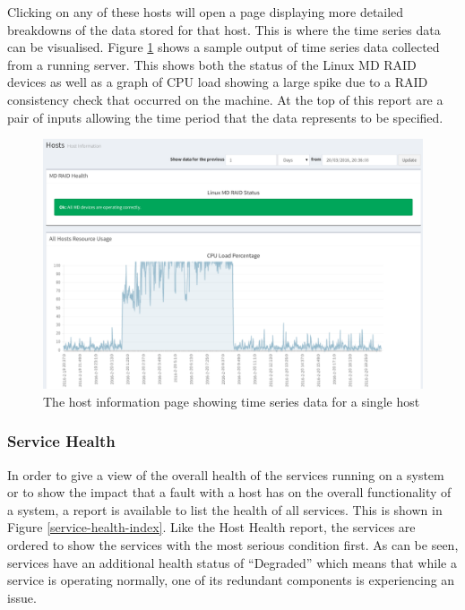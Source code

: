 \documentclass[bsc,logo,twoside,parskip,singlespacing,notimes]{infthesis}
\begin{document}
	Clicking on any of these hosts will open a page displaying more detailed
	breakdowns of the data stored for that host.  This is where the time series
	data can be visualised.  Figure \ref{host-information} shows a sample
	output of time series data collected from a running server.  This shows both
	the status of the Linux MD RAID devices as well as a graph of CPU load
	showing a large spike due to a RAID consistency check that occurred on the
	machine.  At the top of this report are a pair of inputs allowing the time
	period that the data represents to be specified.

\begin{figure}[H]
	\centering
	\caption{The host information page showing time series data for a single host}
	\label{host-information}
	\includegraphics[scale=0.43]{assets/screenshots/host-information.pdf}
\end{figure}

\subsubsection{Service Health}

	In order to give a view of the overall health of the services running on a
	system or to show the impact that a fault with a host has on the overall
	functionality of a system, a report is available to list the health of all
	services.  This is shown in Figure \ref{service-health-index}. Like the
	Host Health report, the services are ordered to show the services with the most
	serious condition first.  As can be seen, services have an additional health
	status of ``Degraded'' which means that while a service is operating normally,
	one of its redundant components is experiencing an issue.
\end{document}
